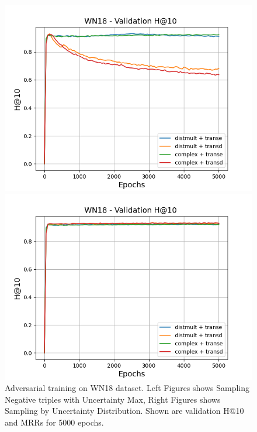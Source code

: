 \begin{figure}
    \begin{minipage}{.5\textwidth}
      \centering
      \includegraphics[width=0.9\linewidth]{figures/results/gan_train/not_pretrained/uncertainty/max/entropy/wn18/gan_train_uncertainty_wn18_hit10s.png}
    \end{minipage}%
    \begin{minipage}{.5\textwidth}
      \centering
      \includegraphics[width=0.9\linewidth]{figures/results/gan_train/not_pretrained/uncertainty/max_distribution/entropy/wn18/gan_train_uncertainty_wn18_hit10s.png}
    \end{minipage}%
    \caption{Adversarial training on \textsc{WN18} dataset. 
    Left Figures shows Sampling Negative triples with Uncertainty Max, Right Figures shows Sampling by Uncertainty Distribution.
    Shown are validation H@10 and MRRs for 5000 epochs.}
    \label{fig:advtrain_not_pretrained_wn18_pretrained}
\end{figure}





